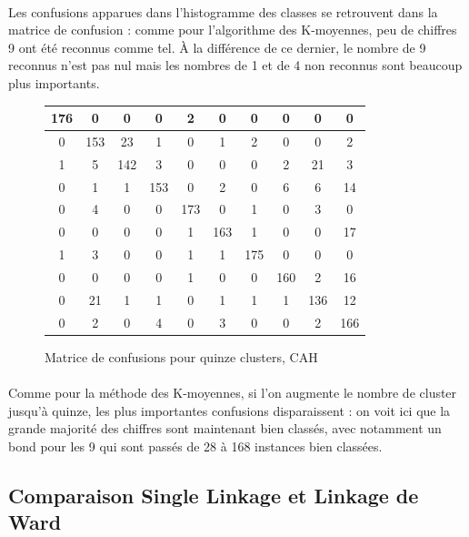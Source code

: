 \documentclass{article}
\begin{document}
    \paragraph{}Les confusions apparues dans l'histogramme des classes se retrouvent dans la matrice de confusion : comme pour l'algorithme des K-moyennes, peu de chiffres 9 ont été reconnus comme tel. À la différence de ce dernier, le nombre de 9 reconnus n'est pas nul mais les nombres de 1 et de 4 non reconnus sont beaucoup plus importants.
    \begin{figure}[H]
        \centering
        \begin{tabular}{|c|c|c|c|c|c|c|c|c|c|}
            \hline
            176 & 0 & 0 & 0 & 2 & 0 & 0 & 0 & 0 & 0 \\
            \hline
            0 & 153 & 23 & 1 & 0 & 1 & 2 & 0 & 0 & 2\\
            \hline
            1 & 5 & 142 & 3 & 0 & 0 & 0 & 2 & 21 & 3\\
            \hline
            0 & 1 & 1 & 153 & 0 & 2 & 0 & 6 & 6 & 14\\
            \hline
            0 & 4 & 0 & 0 & 173 & 0 & 1 & 0 & 3 & 0\\
            \hline
            0 & 0 & 0 & 0 & 1 & 163 & 1 & 0 & 0 & 17\\
            \hline
            1 & 3 & 0 & 0 & 1 & 1 & 175 & 0 & 0 & 0 \\
            \hline
            0 & 0 & 0 & 0 & 1 & 0 & 0 & 160 & 2 & 16 \\
            \hline
            0 & 21 & 1 & 1 & 0 & 1 & 1 & 1 & 136 & 12 \\
            \hline
            0 & 2 & 0 & 4 & 0 & 3 & 0 & 0 & 2 & 166 \\
            \hline
        \end{tabular}
        \caption{Matrice de confusions pour quinze clusters, CAH}    
    \end{figure}
    \paragraph{}Comme pour la méthode des K-moyennes, si l'on augmente le nombre de cluster jusqu'à quinze, les plus importantes confusions disparaissent : on voit ici que la grande majorité des chiffres sont maintenant bien classés, avec notamment un bond pour les 9 qui sont passés de 28 à 168 instances bien classées.
\subsection{Comparaison Single Linkage et Linkage de Ward}
\end{document}
